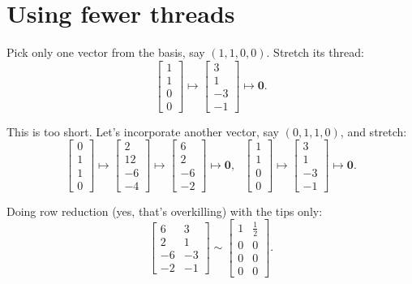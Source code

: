 \documentclass[12pt]{article}
\newcommand{\1}{\mathbf{1}}
\newcommand{\0}{\mathbf{0}}
\theoremstyle{definition}
\begin{document}
\section{Using fewer threads}

Pick only one vector from the basis, say $(1,1,0,0)$.
Stretch its thread:
\[
\left[\begin{matrix}1\\1\\0\\0\end{matrix}\right]
\mapsto
\left[\begin{matrix}3\\1\\-3\\-1\end{matrix}\right]
\mapsto
\0
.
\]

This is too short.
Let's incorporate another vector, say  $(0,1,1,0)$,
and stretch:
\[
\left[\begin{matrix}0\\1\\1\\0\end{matrix}\right]
\mapsto
\left[\begin{matrix}2\\12\\-6\\-4\end{matrix}\right]
\mapsto
\left[\begin{matrix}6\\2\\-6\\-2\end{matrix}\right]
\mapsto
\0
, \ \ \
\left[\begin{matrix}1\\1\\0\\0\end{matrix}\right]
\mapsto
\left[\begin{matrix}3\\1\\-3\\-1\end{matrix}\right]
\mapsto
\0
.
\]

Doing row reduction (yes, that's overkilling) with the tips only:
\[
\left[\begin{matrix}6 & 3\\2 & 1\\-6 & -3\\-2 & -1\end{matrix}\right]
\sim
\left[\begin{matrix}1 & \frac{1}{2}\\0 & 0\\0 & 0\\0 & 0\end{matrix}\right]
.
\]
\end{document}
